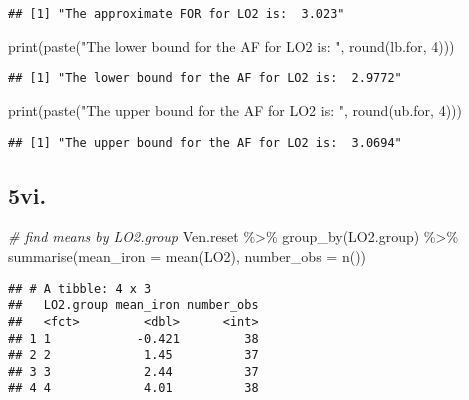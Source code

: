 \documentclass[
]{article}
\newenvironment{Shaded}{\begin{snugshade}}{\end{snugshade}}
\newcommand{\AttributeTok}[1]{\textcolor[rgb]{0.77,0.63,0.00}{#1}}
\newcommand{\CommentTok}[1]{\textcolor[rgb]{0.56,0.35,0.01}{\textit{#1}}}
\newcommand{\DecValTok}[1]{\textcolor[rgb]{0.00,0.00,0.81}{#1}}
\newcommand{\FunctionTok}[1]{\textcolor[rgb]{0.00,0.00,0.00}{#1}}
\newcommand{\NormalTok}[1]{#1}
\newcommand{\SpecialCharTok}[1]{\textcolor[rgb]{0.00,0.00,0.00}{#1}}
\newcommand{\StringTok}[1]{\textcolor[rgb]{0.31,0.60,0.02}{#1}}
\begin{document}
\begin{verbatim}
## [1] "The approximate FOR for LO2 is:  3.023"
\end{verbatim}

\begin{Shaded}
\begin{Highlighting}[]
\FunctionTok{print}\NormalTok{(}\FunctionTok{paste}\NormalTok{(}\StringTok{"The lower bound for the AF for LO2 is: "}\NormalTok{, }\FunctionTok{round}\NormalTok{(lb.for, }\DecValTok{4}\NormalTok{)))}
\end{Highlighting}
\end{Shaded}

\begin{verbatim}
## [1] "The lower bound for the AF for LO2 is:  2.9772"
\end{verbatim}

\begin{Shaded}
\begin{Highlighting}[]
\FunctionTok{print}\NormalTok{(}\FunctionTok{paste}\NormalTok{(}\StringTok{"The upper bound for the AF for LO2 is: "}\NormalTok{, }\FunctionTok{round}\NormalTok{(ub.for, }\DecValTok{4}\NormalTok{)))}
\end{Highlighting}
\end{Shaded}

\begin{verbatim}
## [1] "The upper bound for the AF for LO2 is:  3.0694"
\end{verbatim}

\hypertarget{vi.}{%
\subsection{5vi.}\label{vi.}}

\begin{Shaded}
\begin{Highlighting}[]
\CommentTok{\# find means by LO2.group}
\NormalTok{Ven.reset }\SpecialCharTok{\%\textgreater{}\%}
    \FunctionTok{group\_by}\NormalTok{(LO2.group) }\SpecialCharTok{\%\textgreater{}\%}
    \FunctionTok{summarise}\NormalTok{(}\AttributeTok{mean\_iron =} \FunctionTok{mean}\NormalTok{(LO2), }\AttributeTok{number\_obs =} \FunctionTok{n}\NormalTok{())}
\end{Highlighting}
\end{Shaded}

\begin{verbatim}
## # A tibble: 4 x 3
##   LO2.group mean_iron number_obs
##   <fct>         <dbl>      <int>
## 1 1            -0.421         38
## 2 2             1.45          37
## 3 3             2.44          37
## 4 4             4.01          38
\end{verbatim}
\end{document}
